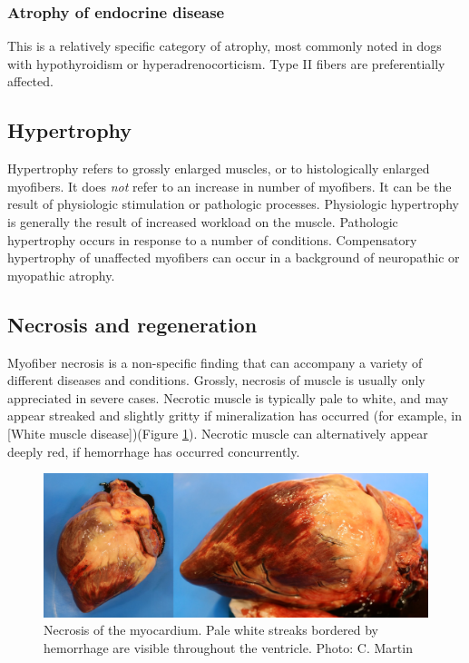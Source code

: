 \documentclass[openany]{book}
\begin{document}
\subsubsection{Atrophy of endocrine
disease}\label{atrophy-of-endocrine-disease}

This is a relatively specific category of atrophy, most commonly noted
in dogs with hypothyroidism or hyperadrenocorticism. Type II fibers are
preferentially affected.

\subsection{Hypertrophy}\label{hypertrophy}

Hypertrophy refers to grossly enlarged muscles, or to histologically
enlarged myofibers. It does \emph{not} refer to an increase in number of
myofibers. It can be the result of physiologic stimulation or pathologic
processes. Physiologic hypertrophy is generally the result of increased
workload on the muscle. Pathologic hypertrophy occurs in response to a
number of conditions. Compensatory hypertrophy of unaffected myofibers
can occur in a background of neuropathic or myopathic atrophy.

\hypertarget{necrosis-and-regeneration}{\subsection{Necrosis and
regeneration}\label{necrosis-and-regeneration}}

Myofiber necrosis is a non-specific finding that can accompany a variety
of different diseases and conditions. Grossly, necrosis of muscle is
usually only appreciated in severe cases. Necrotic muscle is typically
pale to white, and may appear streaked and slightly gritty if
mineralization has occurred (for example, in {[}White muscle
disease{]})(Figure \ref{fig:heart-necrosis}). Necrotic muscle can
alternatively appear deeply red, if hemorrhage has occurred
concurrently.

\begin{figure}

{\centering \includegraphics[width=0.6\linewidth]{images/heart-necrosis-comp} 

}

\caption{Necrosis of the myocardium. Pale white streaks bordered by hemorrhage are visible throughout the ventricle. Photo: C. Martin}\label{fig:heart-necrosis}
\end{figure}
\end{document}
